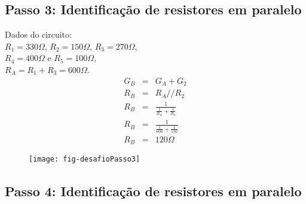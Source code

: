 \subsection{Passo 3: Identificação de resistores em paralelo}

\begin{minipage}{\linewidth}
  \centering
  \begin{minipage}{0.45\linewidth}
    Dados do circuito: \\
                $R_1 = 330\Omega$,
                $R_2 = 150\Omega$,
                $R_3 = 270\Omega$, \\
                $R_4 = 400\Omega$ e
                $R_5 = 100\Omega$,\\
                $R_A = R_1 + R_3 = 600\Omega$.
       \begin{eqnarray}
         G_B & = & G_A + G_2 \nonumber\\
         R_B & = & R_A // R_2 \nonumber\\
         R_B & = & \frac{1}{\frac{1}{R_A} + \frac{1}{R_2} } \nonumber\\
         R_B & = & \frac{1}{\frac{1}{600} + \frac{1}{150} } \nonumber\\
         R_B & = & 120\Omega \nonumber
       \end{eqnarray}

  \end{minipage}
  \hspace{0.05\linewidth}
  \begin{minipage}{0.45\linewidth}
    \begin{figure}[H]
      \centering
      \texttt{[image: fig-desafioPasso3]}
    \end{figure}
  \end{minipage}
\end{minipage}








\subsection{Passo 4: Identificação de resistores em paralelo}

